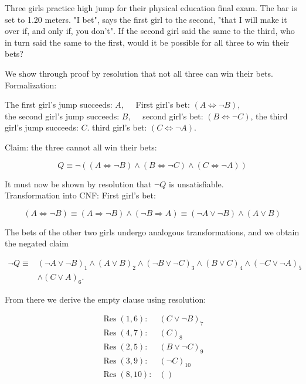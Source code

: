 \documentclass[10pt]{book}
\begin{document}
Three girls practice high jump for their physical education final exam. The bar is set to 1.20 meters. "I bet", says the first girl to the second, "that I will make it over if, and only if, you don't". If the second girl said the same to the third, who in turn said the same to the first, would it be possible for all three to win their bets?

We show through proof by resolution that not all three can win their bets.\\
Formalization:

\begin{displayquote}
The first girl's jump succeeds: $A, \quad$ First girl's bet: $(A \Leftrightarrow \neg B)$,\\
the second girl's jump succeeds: $B, \quad$ second girl's bet: $(B \Leftrightarrow \neg C)$, the third girl's jump succeeds: $C$. third girl's bet: $(C \Leftrightarrow \neg A)$.
\end{displayquote}

Claim: the three cannot all win their bets:

$$
Q \equiv \neg((A \Leftrightarrow \neg B) \wedge(B \Leftrightarrow \neg C) \wedge(C \Leftrightarrow \neg A))
$$

It must now be shown by resolution that $\neg Q$ is unsatisfiable.\\
Transformation into CNF: First girl's bet:

$$
(A \Leftrightarrow \neg B) \equiv(A \Rightarrow \neg B) \wedge(\neg B \Rightarrow A) \equiv(\neg A \vee \neg B) \wedge(A \vee B)
$$

The bets of the other two girls undergo analogous transformations, and we obtain the negated claim

$$
\begin{aligned}
\neg Q \equiv & (\neg A \vee \neg B)_{1} \wedge(A \vee B)_{2} \wedge(\neg B \vee \neg C)_{3} \wedge(B \vee C)_{4} \wedge(\neg C \vee \neg A)_{5} \\
& \wedge(C \vee A)_{6} .
\end{aligned}
$$

From there we derive the empty clause using resolution:

$$
\begin{array}{ll}
\operatorname{Res}(1,6): & (C \vee \neg B)_{7} \\
\operatorname{Res}(4,7): & (C)_{8} \\
\operatorname{Res}(2,5): & (B \vee \neg C)_{9} \\
\operatorname{Res}(3,9): & (\neg C)_{10} \\
\operatorname{Res}(8,10): & ()
\end{array}
$$
\end{document}
